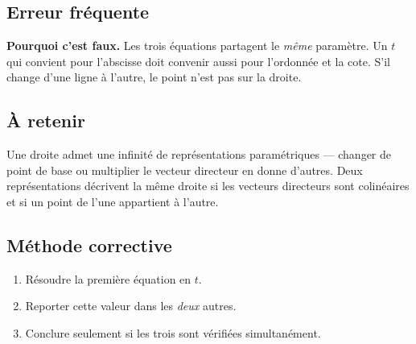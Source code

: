 

\subsection*{Erreur fréquente}


\textbf{Pourquoi c'est faux.} Les trois équations partagent le \emph{même}
paramètre. Un $t$ qui convient pour l'abscisse doit convenir aussi pour
l'ordonnée et la cote. S'il change d'une ligne à l'autre, le point n'est pas
sur la droite.


\subsection*{À retenir}

Une droite admet une infinité de représentations paramétriques --- changer de
point de base ou multiplier le vecteur directeur en donne d'autres. Deux
représentations décrivent la même droite si les vecteurs directeurs sont
colinéaires et si un point de l'une appartient à l'autre.

\subsection*{Méthode corrective}

\begin{enumerate}
  \item Résoudre la première équation en $t$.
  \item Reporter cette valeur dans les \emph{deux} autres.
  \item Conclure seulement si les trois sont vérifiées simultanément.
\end{enumerate}

